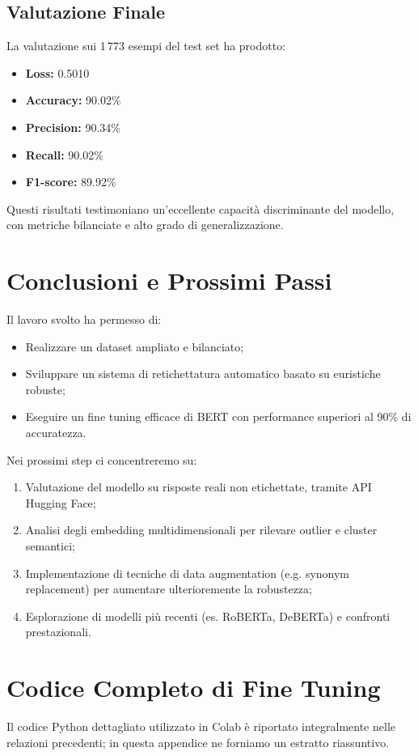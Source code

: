 \documentclass[a4paper,12pt]{article}
\begin{document}
\subsection{Valutazione Finale}
La valutazione sui 1\,773 esempi del test set ha prodotto:
\begin{itemize}
  \item \textbf{Loss:} 0.5010
  \item \textbf{Accuracy:} 90.02\%
  \item \textbf{Precision:} 90.34\%
  \item \textbf{Recall:} 90.02\%
  \item \textbf{F1-score:} 89.92\%
\end{itemize}
Questi risultati testimoniano un'eccellente capacità discriminante del modello, con metriche bilanciate e alto grado di generalizzazione.

\section{Conclusioni e Prossimi Passi}
Il lavoro svolto ha permesso di:
\begin{itemize}
  \item Realizzare un dataset ampliato e bilanciato;
  \item Sviluppare un sistema di retichettatura automatico basato su euristiche robuste;
  \item Eseguire un fine tuning efficace di BERT con performance superiori al 90\% di accuratezza.
\end{itemize}
Nei prossimi step ci concentreremo su:
\begin{enumerate}
  \item Valutazione del modello su risposte reali non etichettate, tramite API Hugging Face;
  \item Analisi degli embedding multidimensionali per rilevare outlier e cluster semantici;
  \item Implementazione di tecniche di data augmentation (e.g. synonym replacement) per aumentare ulterioremente la robustezza;
  \item Esplorazione di modelli più recenti (es. RoBERTa, DeBERTa) e confronti prestazionali.
\end{enumerate}

\appendix
\section{Codice Completo di Fine Tuning}
Il codice Python dettagliato utilizzato in Colab è riportato integralmente nelle relazioni precedenti; in questa appendice ne forniamo un estratto riassuntivo.
\end{document}
